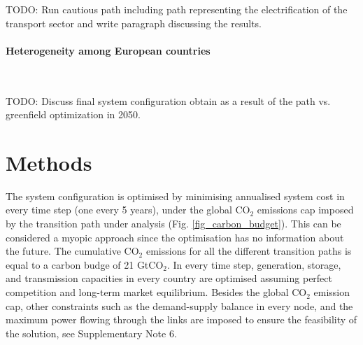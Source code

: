 \documentclass[5p]{elsarticle} %
\begin{document}
\textcolor[rgb]{1,0,0}{TODO: Run cautious path including path representing the electrification of the transport sector and write paragraph discussing the results.}

\paragraph{\textbf{Heterogeneity among European countries}} \

\textcolor[rgb]{1,0,0}{TODO: Discuss final system configuration obtain as a result of the path vs. greenfield optimization in 2050.}

\section{Methods}

The system configuration is optimised by minimising annualised system cost in every time step (one every 5 years), under the global CO$_2$ emissions cap imposed by the transition path under analysis (Fig. \ref{fig_carbon_budget}). This can be considered a myopic approach since the optimisation has no information about the future. The cumulative CO$_2$ emissions for all the different transition paths is equal to a carbon budge of 21 GtCO$_2$. In every time step, generation, storage, and transmission capacities in every country are optimised assuming perfect competition and long-term market equilibrium. Besides the global CO$_2$ emission cap, other constraints such as the demand-supply balance in every node, and the maximum power flowing through the links are imposed to ensure the feasibility of the solution, see Supplementary Note 6. \
\end{document}
